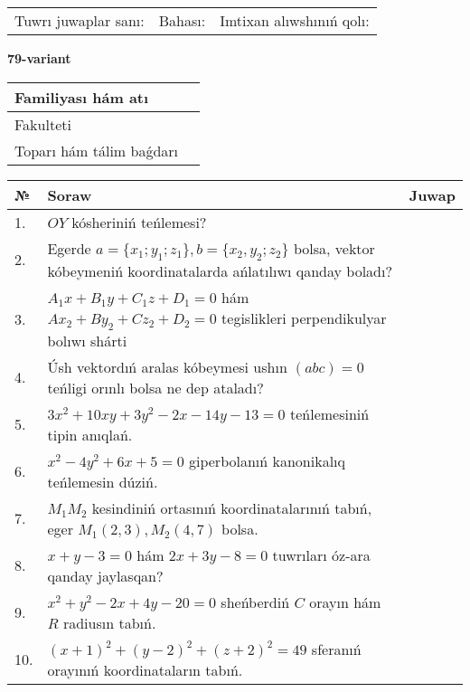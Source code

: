 \documentclass{article}
\begin{document}
\vspace{1cm}

\begin{tabular}{lll}
Tuwrı juwaplar sanı: \underline{\hspace{1.5cm}} & 
Bahası: \underline{\hspace{1.5cm}} & 
Imtixan alıwshınıń qolı: \underline{\hspace{2cm}} \\
\end{tabular}

\egroup

\newpage


\textbf{79-variant}\\

\bgroup
\def\arraystretch{1.6} %

\begin{tabular}{|m{5.7cm}|m{9.5cm}|}
\hline
Familiyası hám atı & \\
\hline
Fakulteti  & \\
\hline
Toparı hám tálim baǵdarı  & \\
\hline
\end{tabular}

\vspace{1cm}

\begin{tabular}{|m{0.7cm}|m{10cm}|m{4cm}|}
\hline
№ & Soraw & Juwap \\
\hline
1. & $OY$ kósheriniń teńlemesi? &  \\
\hline
2. & Egerde $a=\{ x_1; y_1; z_1\}, b=\{ x_2, y_2; z_2\}$ bolsa, vektor kóbeymeniń koordinatalarda ańlatılıwı qanday boladı? &  \\
\hline
3. & $A_1x+B_1y+C_1z+D_1=0$ hám $Ax_2+By_2+Cz_2+D_2=0$ tegislikleri perpendikulyar bolıwı shárti &  \\
\hline
4. & Úsh vektordıń aralas kóbeymesi ushın $(abc)=0$ teńligi orınlı bolsa ne dep ataladı? &  \\
\hline
5. & $3x^{2}+10xy+3y^{2}-2x-14y-13=0$ teńlemesiniń tipin anıqlań. &  \\
\hline
6. & $x^{2}-4y^{2}+6x+5=0$ giperbolanıń kanonikalıq teńlemesin dúziń. &  \\
\hline
7. & $M_{1}M_{2}$ kesindiniń ortasınıń koordinatalarınıń tabıń, eger $M_{1} (2, 3), M_{2} (4, 7)$ bolsa. &  \\
\hline
8. & $x+y-3=0$ hám $2x+3y-8=0$ tuwrıları óz-ara qanday jaylasqan? &  \\
\hline
9. & $x^{2}+y^{2}-2x+4y-20=0$ sheńberdiń $C$ orayın hám $R$ radiusın tabıń. &  \\
\hline
10. & $(x+1)^{2}+(y-2) ^{2}+(z+2) ^{2}=49$ sferanıń orayınıń koordinataların tabıń. &  \\
\hline
\end{tabular}
\end{document}
